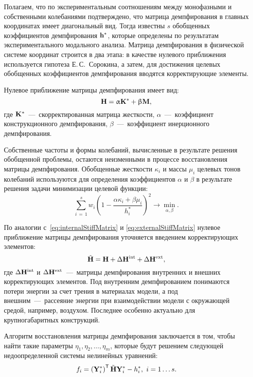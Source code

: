 Полагаем, что по экспериментальным соотношениям между монофазными и собственными колебаниями подтверждено, что матрица демпфирования в главных координатах имеет диагональный вид. Тогда известны $ s $ обобщенных коэффициентов демпфирования $ \mathbf{h} ^ \ast $, которые определены по результатам экспериментального модального анализа. Матрица демпфирования в физической системе координат строится в два этапа: в качестве нулевого приближения используется гипотеза Е.\,С.~Сорокина, а затем, для достижения целевых обобщенных коэффициентов демпфирования вводятся корректирующие элементы.

Нулевое приближение матрицы демпфирования имеет вид:
\begin{equation}
	\mathbf{H} = \upalpha \mathbf{K} ^ \ast + \upbeta \mathbf{M},
\end{equation}
где $ \mathbf{K} ^ \ast $~---~скорректированная матрица жесткости, $ \alpha $~---~коэффициент конструкционного демпфирования, $ \beta $~---~коэффициент инерционного демпфирования.

Собственные частоты и формы колебаний, вычисленные в результате решения обобщенной проблемы, остаются неизменными в процессе восстановления матрицы демпфирования. Обобщенные жесткости $ \kappa_i $ и массы $ \mu_i $ целевых тонов колебаний используются для определения коэффициентов $ \alpha $ и $ \beta $ в результате решения задачи минимизации целевой функции:
\begin{equation}
	\sum \limits_{i\,=\,1} ^ s w_i \left( 1 - \frac{\alpha \kappa_i + \beta \mu_i}{h_i ^ \ast} \right)^2 \rightarrow \min_{\alpha, \beta}.
\end{equation}

По аналогии с~\eqref{eq:internalStiffMatrix} и \eqref{eq:externalStiffMatrix} нулевое приближение матрицы демпфирования уточняется введением корректирующих элементов:
\begin{equation}
	\tilde{\mathbf{H}} = \mathbf{H} + \Delta \mathbf{H} ^ {\text{int}} + \Delta \mathbf{H} ^ {\text{ext}},
\end{equation}
где $ \Delta \mathbf{H} ^ {\text{int}} $ и $ \Delta \mathbf{H} ^ {\text{ext}} $~---~матрицы демпфирования внутренних и внешних корректирующих элементов. Под внутренним демпфированием понимаются потери энергии за счет трения в материалах модели, а под внешним~---~рассеяние энергии при взаимодействии модели с окружающей средой, например, воздухом. Последнее особенно актуально для крупногабаритных конструкций.

Алгоритм восстановления матрицы демпфирования заключается в том, чтобы найти такие параметры $ \eta_1, \eta_2, \hdots, \eta_m $, которые будут решением следующей недоопределенной системы нелинейных уравнений:
\begin{equation}
	f_i = \left( \mathbf{Y}_i ^ \ast \right) ^ \mathsf{T} \tilde{\mathbf{H}} \mathbf{Y}_i ^ \ast - h_i ^ \ast, \ i = 1 \hdots s. \label{eq:systemDampUpdating}
\end{equation}

